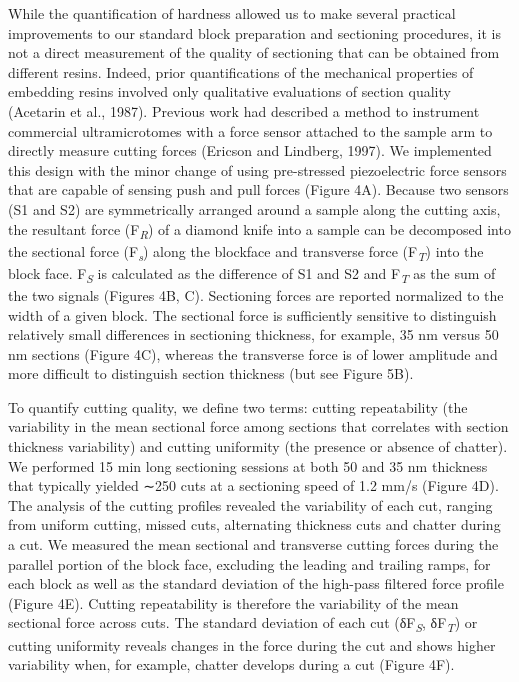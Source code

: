 \documentclass{article}
\begin{document}
While the quantification of hardness allowed us to make several practical improvements to our standard block preparation and sectioning procedures, it is not a direct measurement of the quality of sectioning that can be obtained from different resins. Indeed, prior quantifications of the mechanical properties of embedding resins involved only qualitative evaluations of section quality (Acetarin et al., 1987). Previous work had described a method to instrument commercial ultramicrotomes with a force sensor attached to the sample arm to directly measure cutting forces (Ericson and Lindberg, 1997). We implemented this design with the minor change of using pre-stressed piezoelectric force sensors that are capable of sensing push and pull forces (Figure 4A). Because two sensors (S1 and S2) are symmetrically arranged around a sample along the cutting axis, the resultant force (F\textsubscript{\emph{R}}) of a diamond knife into a sample can be decomposed into the sectional force (F\textsubscript{\emph{s}}) along the blockface and transverse force (F\textsubscript{\emph{T}}) into the block face. F\textsubscript{\emph{S}} is calculated as the difference of S1 and S2 and F\textsubscript{\emph{T}} as the sum of the two signals (Figures 4B, C). Sectioning forces are reported normalized to the width of a given block. The sectional force is sufficiently sensitive to distinguish relatively small differences in sectioning thickness, for example, 35 nm versus 50 nm sections (Figure 4C), whereas the transverse force is of lower amplitude and more difficult to distinguish section thickness (but see Figure 5B).

To quantify cutting quality, we define two terms: cutting repeatability (the variability in the mean sectional force among sections that correlates with section thickness variability) and cutting uniformity (the presence or absence of chatter). We performed 15 min long sectioning sessions at both 50 and 35 nm thickness that typically yielded ∼250 cuts at a sectioning speed of 1.2 mm/s (Figure 4D). The analysis of the cutting profiles revealed the variability of each cut, ranging from uniform cutting, missed cuts, alternating thickness cuts and chatter during a cut. We measured the mean sectional and transverse cutting forces during the parallel portion of the block face, excluding the leading and trailing ramps, for each block as well as the standard deviation of the high-pass filtered force profile (Figure 4E). Cutting repeatability is therefore the variability of the mean sectional force across cuts. The standard deviation of each cut (δF\textsubscript{\emph{S}}, δF\textsubscript{\emph{T}}) or cutting uniformity reveals changes in the force during the cut and shows higher variability when, for example, chatter develops during a cut (Figure 4F).
\end{document}
